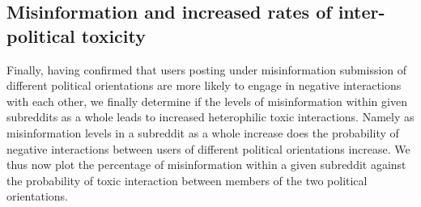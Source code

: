 \subsection{Misinformation and increased rates of inter-political toxicity}
Finally, having confirmed that users posting under misinformation submission of different political orientations are more likely to engage in negative interactions with each other, we finally determine if the levels of misinformation within given subreddits as a whole leads to increased heterophilic toxic interactions. Namely as misinformation levels in a subreddit as a whole increase does the probability of negative interactions between users of different political orientations increase. We thus now plot the percentage of misinformation within a given subreddit against the probability of toxic interaction between members of the two political orientations. 


